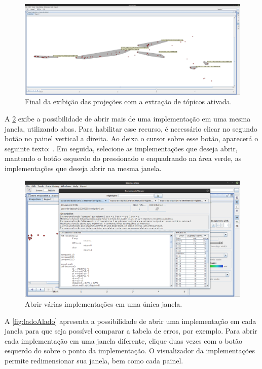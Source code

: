 		\begin{figure}
			\centering
			\includegraphics[width=1\linewidth]{imagem/topics3}
			\caption{Final da exibição das projeções com a extração de tópicos ativada.}
			\label{fig:topics3}
		\end{figure}
		
		A \cref{fig:multiplosDoc} exibe a possibilidade de abrir mais de uma implementação
		em uma mesma janela, utilizando abas. Para habilitar esse recurso, é necessário
		clicar no segundo botão no painel vertical a direita. Ao deixa o cursor sobre esse
		botão, aparecerá o seguinte texto: . Em seguida, selecione
		as implementações que deseja abrir, mantendo o botão esquerdo do 
		pressionado e enquadrando na área verde, as implementações que deseja abrir na
		mesma janela.
		
		\begin{figure}[t]
			\centering
			\includegraphics[width=.95\linewidth]{imagem/multiplosDoc}
			\caption{Abrir várias implementações em uma única janela.}
			\label{fig:multiplosDoc}
		\end{figure}
		
		A \cref{fig:ladoAlado} apresenta a possibilidade de abrir uma implementação em
		cada janela para que seja possível comparar a tabela de erros, por exemplo.
		Para abrir cada implementação em uma janela diferente, clique duas vezes com
		o botão esquerdo do  sobre o ponto da implementação. O
		visualizador da implementações permite redimensionar sua janela, bem como
		cada painel.
		
